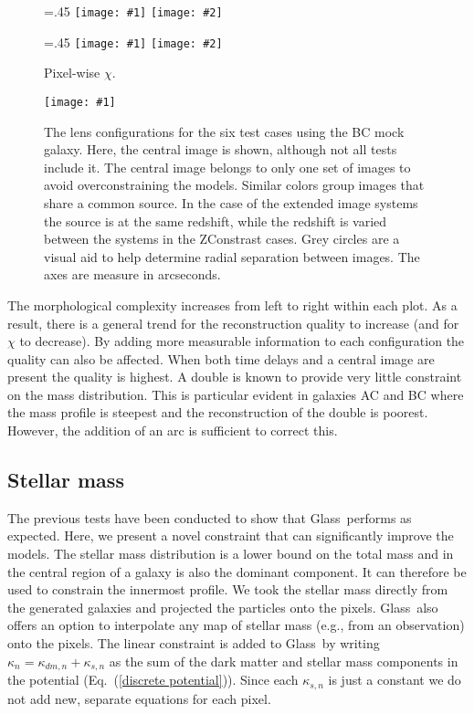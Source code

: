 \documentclass[galley,usenatbib]{mn2e}
\newcommand{\Glass}{{\sc Glass}}
\newcommand{\eqnref}[1] {Eq.~(\ref{#1})}
\newcommand\plotone[1]{%
 \centering
 \leavevmode
 \texttt{[image: \#1]}%
}%
\newcommand\plottwo[2]{{%
 \centering
 \leavevmode
 \columnwidth=.45\columnwidth
 \texttt{[image: \#1]}%
 \hfil
 \texttt{[image: \#2]}%
}}%
\begin{document}
\begin{figure}
\plottwo{AAchi2-full.pdf}{BBchi2-full.pdf}

\plottwo{ACchi2-full.pdf}{BCchi2-full.pdf}
\caption{Pixel-wise $\chi$.}
\label{main results}
\end{figure}

\begin{figure}
\plotone{BCarrival_surfaces}
\caption{The lens configurations for the six test cases using the BC mock galaxy. Here,
the central image is shown, although not all tests include it. The central image belongs
to only one set of images to avoid overconstraining the models. Similar colors group
images that share a common source. In the case of the extended image systems the source
is at the same redshift, while the redshift is varied between the systems in the 
ZConstrast cases. Grey circles are a visual aid to help determine radial separation
between images. The axes are measure in arcseconds.}
\label{arrival surfaces}
\end{figure}

The morphological complexity increases from left to right within each plot. As
a result, there is a general trend for the reconstruction quality to increase
(and for $\chi$ to decrease). By adding more measurable information to each
configuration the quality can also be affected. When both time delays and a
central image are present the quality is highest. A double is known to provide
very little constraint on the mass distribution. This is particular evident in
galaxies AC and BC where the mass profile is steepest and the reconstruction of
the double is poorest. However, the addition of an arc is sufficient to correct
this.

\subsection{Stellar mass}
\label{stellar mass}

The previous tests have been conducted to show that \Glass\ performs as expected.
Here, we present a novel constraint that can significantly improve the models. 
The stellar mass distribution is a lower bound on the total mass and in the
central region of a galaxy is also the dominant component. It can therefore be
used to constrain the innermost profile. We took the stellar mass directly from
the generated galaxies and projected the particles onto the pixels. \Glass\
also offers an option to interpolate any map of stellar mass (e.g., from an
observation) onto the pixels. The linear constraint is added to \Glass\ by
writing $\kappa_n = \kappa_{dm,n} + \kappa_{s,n}$ as the sum of the
dark matter and stellar mass components in the potential (\eqnref{discrete
potential}). Since each $\kappa_{s,n}$ is just a constant we do not add new,
separate equations for each pixel. 
\end{document}
